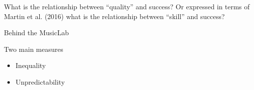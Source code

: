 \documentclass[aspectratio=169]{beamer}
\begin{document}
\begin{frame}

What is the relationship between ``quality'' and success?  Or expressed in terms of Martin et al. (2016) what is the relationship between ``skill'' and success?

\end{frame}
\begin{frame}

\begin{center}
\end{center}
 
\end{frame}
\begin{frame}

\begin{center}
\LARGE{Behind the MusicLab}
\end{center}

\end{frame}
\begin{frame}

Two main measures
\begin{itemize}
\item Inequality
\item Unpredictability
\end{itemize}

\end{frame}
\end{document}

